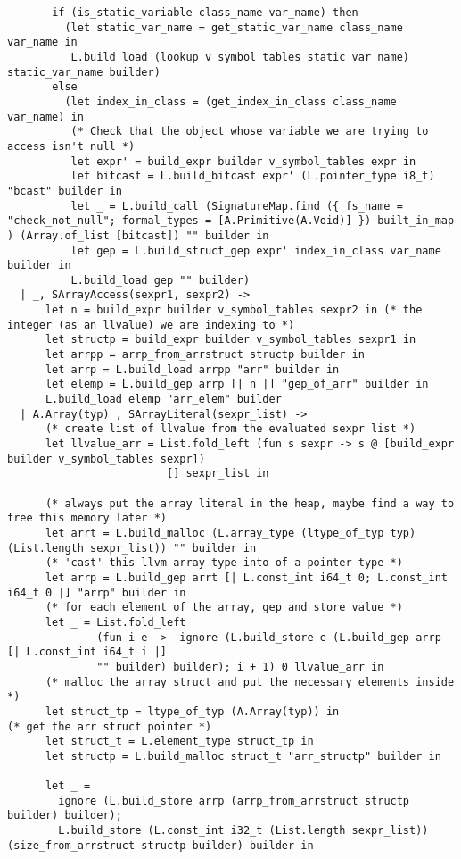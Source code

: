 \documentclass{article}
\begin{document}
\begin{verbatim}
       if (is_static_variable class_name var_name) then
         (let static_var_name = get_static_var_name class_name var_name in
          L.build_load (lookup v_symbol_tables static_var_name) static_var_name builder)
       else
         (let index_in_class = (get_index_in_class class_name var_name) in
          (* Check that the object whose variable we are trying to access isn't null *)
          let expr' = build_expr builder v_symbol_tables expr in
          let bitcast = L.build_bitcast expr' (L.pointer_type i8_t) "bcast" builder in
          let _ = L.build_call (SignatureMap.find ({ fs_name = "check_not_null"; formal_types = [A.Primitive(A.Void)] }) built_in_map ) (Array.of_list [bitcast]) "" builder in
          let gep = L.build_struct_gep expr' index_in_class var_name builder in
          L.build_load gep "" builder)
  | _, SArrayAccess(sexpr1, sexpr2) ->
      let n = build_expr builder v_symbol_tables sexpr2 in (* the integer (as an llvalue) we are indexing to *)
      let structp = build_expr builder v_symbol_tables sexpr1 in
      let arrpp = arrp_from_arrstruct structp builder in
      let arrp = L.build_load arrpp "arr" builder in
      let elemp = L.build_gep arrp [| n |] "gep_of_arr" builder in
      L.build_load elemp "arr_elem" builder
  | A.Array(typ) , SArrayLiteral(sexpr_list) ->
      (* create list of llvalue from the evaluated sexpr list *)
      let llvalue_arr = List.fold_left (fun s sexpr -> s @ [build_expr builder v_symbol_tables sexpr])
                         [] sexpr_list in
      
      (* always put the array literal in the heap, maybe find a way to free this memory later *)
      let arrt = L.build_malloc (L.array_type (ltype_of_typ typ) (List.length sexpr_list)) "" builder in
      (* 'cast' this llvm array type into of a pointer type *)
      let arrp = L.build_gep arrt [| L.const_int i64_t 0; L.const_int i64_t 0 |] "arrp" builder in
      (* for each element of the array, gep and store value *)
      let _ = List.fold_left 
              (fun i e ->  ignore (L.build_store e (L.build_gep arrp [| L.const_int i64_t i |] 
              "" builder) builder); i + 1) 0 llvalue_arr in
      (* malloc the array struct and put the necessary elements inside *)
      let struct_tp = ltype_of_typ (A.Array(typ)) in                  (* get the arr struct pointer *)
      let struct_t = L.element_type struct_tp in       
      let structp = L.build_malloc struct_t "arr_structp" builder in

      let _ = 
        ignore (L.build_store arrp (arrp_from_arrstruct structp builder) builder);
        L.build_store (L.const_int i32_t (List.length sexpr_list)) (size_from_arrstruct structp builder) builder in


\end{verbatim}
\end{document}
